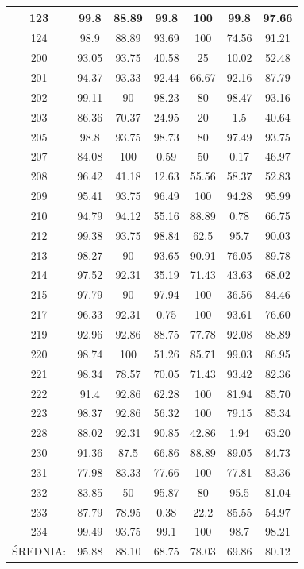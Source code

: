 \documentclass[10pt,a4paper]{article}
\begin{document}
\begin{table}
{\begin{tabular}{ | c | c | c | c | c | c | c |}
	123 & 99.8 & 88.89 & 99.8 & 100 & 99.8 & 97.66 \\ \hline
	124 & 98.9 & 88.89 & 93.69 & 100 & 74.56 & 91.21 \\ \hline
	200 & 93.05 & 93.75 & 40.58 & 25 & 10.02 & 52.48 \\ \hline
	201 & 94.37 & 93.33 & 92.44 & 66.67 & 92.16 & 87.79 \\ \hline
	202 & 99.11 & 90 & 98.23 & 80 & 98.47 & 93.16 \\ \hline
	203 & 86.36 & 70.37 & 24.95 & 20 & 1.5 & 40.64 \\ \hline
	205 & 98.8 & 93.75 & 98.73 & 80 & 97.49 & 93.75 \\ \hline
	207 & 84.08 & 100 & 0.59 & 50 & 0.17 & 46.97 \\ \hline
	208 & 96.42 & 41.18 & 12.63 & 55.56 & 58.37 & 52.83 \\ \hline
	209 & 95.41 & 93.75 & 96.49 & 100 & 94.28 & 95.99 \\ \hline
	210 & 94.79 & 94.12 & 55.16 & 88.89 & 0.78 & 66.75 \\ \hline
	212 & 99.38 & 93.75 & 98.84 & 62.5 & 95.7 & 90.03 \\ \hline
	213 & 98.27 & 90 & 93.65 & 90.91 & 76.05 & 89.78 \\ \hline
	214 & 97.52 & 92.31 & 35.19 & 71.43 & 43.63 & 68.02 \\ \hline
	215 & 97.79 & 90 & 97.94 & 100 & 36.56 & 84.46 \\ \hline
	217 & 96.33 & 92.31 & 0.75 & 100 & 93.61 & 76.60 \\ \hline
	219 & 92.96 & 92.86 & 88.75 & 77.78 & 92.08 & 88.89 \\ \hline
	220 & 98.74 & 100 & 51.26 & 85.71 & 99.03 & 86.95 \\ \hline
	221 & 98.34 & 78.57 & 70.05 & 71.43 & 93.42 & 82.36 \\ \hline
	222 & 91.4 & 92.86 & 62.28 & 100 & 81.94 & 85.70 \\ \hline
	223 & 98.37 & 92.86 & 56.32 & 100 & 79.15 & 85.34 \\ \hline
	228 & 88.02 & 92.31 & 90.85 & 42.86 & 1.94 & 63.20 \\ \hline
	230 & 91.36 & 87.5 & 66.86 & 88.89 & 89.05 & 84.73 \\ \hline
	231 & 77.98 & 83.33 & 77.66 & 100 & 77.81 & 83.36 \\ \hline
	232 & 83.85 & 50 & 95.87 & 80 & 95.5 & 81.04 \\ \hline
	233 & 87.79 & 78.95 & 0.38 & 22.2 & 85.55 & 54.97 \\ \hline
	234 & 99.49 & 93.75 & 99.1 & 100 & 98.7 & 98.21 \\ \hline
	ŚREDNIA: & 95.88 & 88.10 & 68.75 & 78.03 & 69.86 & 80.12 \\ \hline
\end{tabular}
}

\end{table}
\end{document}
